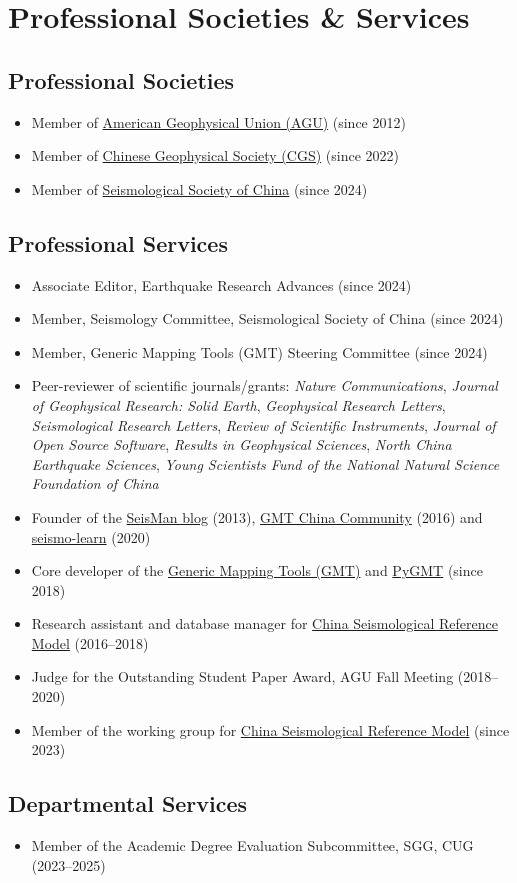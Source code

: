 \section{Professional Societies \& Services}

\subsection{Professional Societies}
\begin{itemize}
\item Member of \href{https://sites.agu.org/}{American Geophysical Union (AGU)} (since 2012)
\item Member of \href{http://www.cgscgs.org.cn/}{Chinese Geophysical Society (CGS)} (since 2022)
\item Member of \href{https://www.ssoc.org.cn/}{Seismological Society of China} (since 2024)
\end{itemize}

\subsection{Professional Services}
\begin{itemize}
\item Associate Editor, Earthquake Research Advances (since 2024)
\item Member, Seismology Committee, Seismological Society of China (since 2024)
\item Member, Generic Mapping Tools (GMT) Steering Committee (since 2024)
\item Peer-reviewer of scientific journals/grants:
      \emph{Nature Communications},
      \emph{Journal of Geophysical Research: Solid Earth},
      \emph{Geophysical Research Letters},
      \emph{Seismological Research Letters},
      \emph{Review of Scientific Instruments},
      \emph{Journal of Open Source Software},
      \emph{Results in Geophysical Sciences},
      \emph{North China Earthquake Sciences},
      \emph{Young Scientists Fund of the National Natural Science Foundation of China}
\item Founder of the \href{https://blog.seisman.info}{SeisMan blog} (2013),
      \href{http://gmt-china.org/}{GMT China Community} (2016)
      and \href{https://seismo-learn.org/}{seismo-learn} (2020)
\item Core developer of the \href{https://github.com/GenericMappingTools/gmt}{Generic Mapping Tools (GMT)} and
      \href{https://github.com/GenericMappingTools/pygmt}{PyGMT} (since 2018)
\item Research assistant and database manager for \href{http://chinageorefmodel.org/}{China Seismological Reference Model} (2016--2018)
\item Judge for the Outstanding Student Paper Award, AGU Fall Meeting (2018--2020)
\item Member of the working group for \href{http://chinageorefmodel.org/}{China Seismological Reference Model} (since 2023)
\end{itemize}

\subsection{Departmental Services}
\begin{itemize}
\item Member of the Academic Degree Evaluation Subcommittee, SGG, CUG (2023--2025)
\end{itemize}
